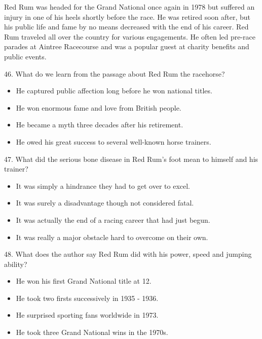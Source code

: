 \documentclass[UTF8,11pt]{ctexart}
\begin{document}
Red Rum was headed for the Grand National once again in 1978 but suffered an injury in one of his heels shortly before the race. He was retired soon after, but his public life and fame by no means decreased with the end of his career. Red Rum traveled all over the country for various engagements. He often led pre-race parades at Aintree Racecourse and was a popular guest at charity benefits and public events.


46. What do we learn from the passage about Red Rum the racehorse?


\begin{itemize}[leftmargin=2em,itemsep=.2em,topsep=.4em]\item[A.] He captured public affection long before he won national titles.
\item[B.] He won enormous fame and love from British people.
\item[C.] He became a myth three decades after his retirement.
\item[D.] He owed his great success to several well-known horse trainers.
\end{itemize}

47. What did the serious bone disease in Red Rum’s foot mean to himself and his trainer?


\begin{itemize}[leftmargin=2em,itemsep=.2em,topsep=.4em]\item[A.] It was simply a hindrance they had to get over to excel.
\item[B.] It was surely a disadvantage though not considered fatal.
\item[C.] It was actually the end of a racing career that had just begun.
\end{itemize}

\begin{itemize}[leftmargin=2em,itemsep=.2em,topsep=.4em]\item[D.] It was really a major obstacle hard to overcome on their own.
\end{itemize}

48. What does the author say Red Rum did with his power, speed and jumping ability?


\begin{itemize}[leftmargin=2em,itemsep=.2em,topsep=.4em]\item[A.] He won his first Grand National title at 12.
\item[B.] He took two firsts successively in 1935 - 1936.
\item[C.] He surprised sporting fans worldwide in 1973.
\item[D.] He took three Grand National wins in the 1970s.
\end{itemize}
\end{document}
